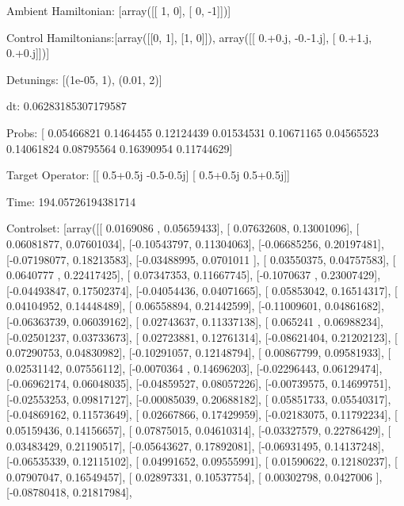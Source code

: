 \documentclass{article}
\begin{document}
    

\newpage

Ambient Hamiltonian: [array([[ 1,  0],
       [ 0, -1]])]

Control Hamiltonians:[array([[0, 1],
       [1, 0]]), array([[ 0.+0.j, -0.-1.j],
       [ 0.+1.j,  0.+0.j]])]

Detunings: [(1e-05, 1), (0.01, 2)]

 dt: 0.06283185307179587

Probs: [ 0.05466821  0.1464455   0.12124439  0.01534531  0.10671165  0.04565523
  0.14061824  0.08795564  0.16390954  0.11744629]

Target Operator: [[ 0.5+0.5j -0.5-0.5j]
 [ 0.5+0.5j  0.5+0.5j]]

Time: 194.05726194381714

Controlset: [array([[ 0.0169086 ,  0.05659433],
       [ 0.07632608,  0.13001096],
       [ 0.06081877,  0.07601034],
       [-0.10543797,  0.11304063],
       [-0.06685256,  0.20197481],
       [-0.07198077,  0.18213583],
       [-0.03488995,  0.0701011 ],
       [ 0.03550375,  0.04757583],
       [ 0.0640777 ,  0.22417425],
       [ 0.07347353,  0.11667745],
       [-0.1070637 ,  0.23007429],
       [-0.04493847,  0.17502374],
       [-0.04054436,  0.04071665],
       [ 0.05853042,  0.16514317],
       [ 0.04104952,  0.14448489],
       [ 0.06558894,  0.21442599],
       [-0.11009601,  0.04861682],
       [-0.06363739,  0.06039162],
       [ 0.02743637,  0.11337138],
       [ 0.065241  ,  0.06988234],
       [-0.02501237,  0.03733673],
       [ 0.02723881,  0.12761314],
       [-0.08621404,  0.21202123],
       [ 0.07290753,  0.04830982],
       [-0.10291057,  0.12148794],
       [ 0.00867799,  0.09581933],
       [ 0.02531142,  0.07556112],
       [-0.0070364 ,  0.14696203],
       [-0.02296443,  0.06129474],
       [-0.06962174,  0.06048035],
       [-0.04859527,  0.08057226],
       [-0.00739575,  0.14699751],
       [-0.02553253,  0.09817127],
       [-0.00085039,  0.20688182],
       [ 0.05851733,  0.05540317],
       [-0.04869162,  0.11573649],
       [ 0.02667866,  0.17429959],
       [-0.02183075,  0.11792234],
       [ 0.05159436,  0.14156657],
       [ 0.07875015,  0.04610314],
       [-0.03327579,  0.22786429],
       [ 0.03483429,  0.21190517],
       [-0.05643627,  0.17892081],
       [-0.06931495,  0.14137248],
       [-0.06535339,  0.12115102],
       [ 0.04991652,  0.09555991],
       [ 0.01590622,  0.12180237],
       [ 0.07907047,  0.16549457],
       [ 0.02897331,  0.10537754],
       [ 0.00302798,  0.0427006 ],
       [-0.08780418,  0.21817984],
\end{document}
